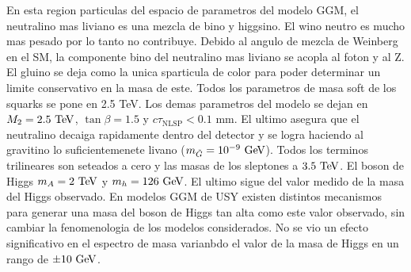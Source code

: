 En esta region particulas del espacio de parametros del modelo GGM, el
neutralino mas liviano es una mezcla de bino y higgsino. El wino neutro es mucho
mas pesado por lo tanto no contribuye. Debido al angulo de mezcla de Weinberg en
el SM, la componente bino del neutralino mas liviano se acopla al foton y al Z.
El gluino se deja como la unica sparticula de color para poder determinar un
limite conservativo en la masa de este. Todos los parametros de masa soft de los
squarks se pone en 2.5 TeV. Los demas parametros del modelo se dejan en $M_2=2.5\tev$,
$\tan\beta=1.5$ y $c\tau_{\mathrm{NLSP}} < 0.1$ mm. El ultimo asegura
que el neutralino decaiga rapidamente dentro del detector y se logra haciendo al
gravitino lo suficientemenete livano ($m_{\tilde{G}}=10^{-9} \gev$). Todos los
terminos trilineares son seteados a cero y las masas de los sleptones a $3.5 \tev$.
El boson de Higgs $m_{A} = 2 \tev$ y $m_{h} = 126 \gev$. El ultimo
sigue del valor medido de la masa del Higgs observado. En modelos GGM de USY
existen distintos
mecanismos\cite{Craig:2011yk,Auzzi:2011eu,Csaki:2012fh,Larsen:2012rq,Craig:2012hc}
para generar una masa del boson de Higgs tan alta como este valor observado, sin
cambiar la fenomenologia de los modelos considerados. No se vio un efecto
significativo en el espectro de masa varianbdo el valor de la masa de Higgs en
un rango de $\pm 10 \gev$.

